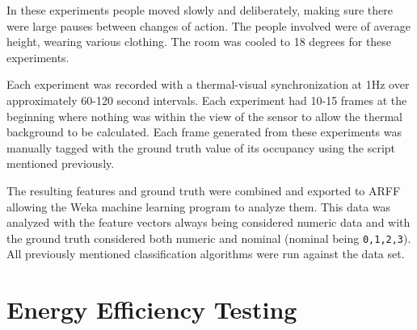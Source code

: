 \documentclass[../thesis/thesis.tex]{subfiles}
\begin{document}
In these experiments people moved slowly and deliberately, making sure there were large pauses between changes of action. The people involved were of average height, wearing various clothing. The room was cooled to 18 degrees for these experiments.

Each experiment was recorded with a thermal-visual synchronization at 1Hz over approximately 60-120 second intervals. Each experiment had 10-15 frames at the beginning where nothing was within the view of the sensor to allow the thermal background to be calculated. Each frame generated from these experiments was manually tagged with the ground truth value of its occupancy using the script mentioned previously.

The resulting features and ground truth were combined and exported to ARFF allowing the Weka machine learning program to analyze them. This data was analyzed with the feature vectors always being considered numeric data and with the ground truth considered both numeric and nominal (nominal being \texttt{{0,1,2,3}}). All previously mentioned classification algorithms were run against the data set.

\section{Energy Efficiency Testing}


\end{document}
